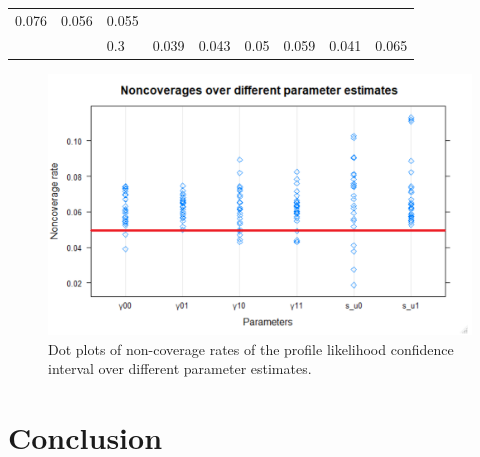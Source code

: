 \documentclass[12pt,oneside,a4paper]{reedthesis}
\begin{document}
\begin{longtable}[]{@{}lllllllll@{}}
\begin{minipage}[t]{0.08\columnwidth}
0.076\strut
\end{minipage} & \begin{minipage}[t]{0.08\columnwidth}\raggedright
0.056\strut
\end{minipage} & \begin{minipage}[t]{0.08\columnwidth}\raggedright
0.055\strut
\end{minipage}\tabularnewline
\begin{minipage}[t]{0.12\columnwidth}\raggedright
\strut
\end{minipage} & \begin{minipage}[t]{0.09\columnwidth}\raggedright
\strut
\end{minipage} & \begin{minipage}[t]{0.06\columnwidth}\raggedright
0.3\strut
\end{minipage} & \begin{minipage}[t]{0.08\columnwidth}\raggedright
0.039\strut
\end{minipage} & \begin{minipage}[t]{0.08\columnwidth}\raggedright
0.043\strut
\end{minipage} & \begin{minipage}[t]{0.08\columnwidth}\raggedright
0.05\strut
\end{minipage} & \begin{minipage}[t]{0.08\columnwidth}\raggedright
0.059\strut
\end{minipage} & \begin{minipage}[t]{0.08\columnwidth}\raggedright
0.041\strut
\end{minipage} & \begin{minipage}[t]{0.08\columnwidth}\raggedright
0.065\strut
\end{minipage}\tabularnewline
\bottomrule
\end{longtable}
\begin{figure}
\includegraphics[width=0.8\linewidth]{figure/noncov} \caption{Dot plots of non-coverage rates of the profile likelihood confidence interval over different parameter estimates.}\label{fig:noncov}
\end{figure}
\hypertarget{conclusion}{%
\chapter{Conclusion}\label{conclusion}}
\end{document}
